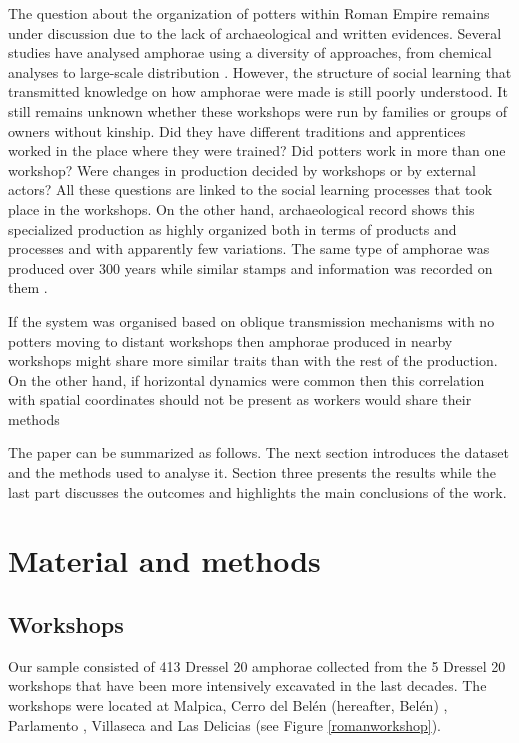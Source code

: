 \documentclass[review]{elsarticle}
\begin{document}
The question about the organization of potters within Roman Empire remains under discussion due to the lack of archaeological and written evidences. Several studies have analysed amphorae using a diversity of approaches, from chemical analyses to large-scale distribution \citep{isaksen_network_2006,brughmans_roman_2016,coto-sarmiento_maria_bayesian_????}. However, the structure of social learning that transmitted knowledge on how amphorae were made is still poorly understood. It still remains unknown whether these workshops were run by families or groups of owners without kinship. Did they have different traditions and apprentices worked in the place where they were trained? Did potters work in more than one workshop? Were changes in production decided by workshops or by external actors? All these questions are linked to the social learning processes that took place in the workshops. On the other hand, archaeological record shows this specialized production as highly organized both in terms of products and processes and with apparently few variations. The same type of amphorae was produced over 300 years while similar stamps and information was recorded on them \citep{remesal_anforas_2004}.

If the system was organised based on oblique transmission mechanisms with no potters moving to distant workshops then amphorae produced in nearby workshops might share more similar traits than with the rest of the production. On the other hand, if horizontal dynamics were common then this correlation with spatial coordinates should not be present as workers would share their methods

The paper can be summarized as follows. The next section introduces the dataset and the methods used to analyse it. Section three presents the results while the last part discusses the outcomes and highlights the main conclusions of the work. 

\section{Material and methods}

\subsection{Workshops}

Our sample consisted of 413 Dressel 20 amphorae collected from the 5 Dressel 20 workshops that have been more intensively excavated in the last decades. The workshops were located at Malpica, Cerro del Belén (hereafter, Belén) \citep{diaz_trujillo_excavacion_1992}, Parlamento \citep{garcia_vargas_anforas_2000}, Villaseca\citep{garcia_vargas_enrique_excavacion_????} and Las Delicias \citep{fernandez_excavacion_2001,_atelier_2014} (see Figure \ref{romanworkshop}).
\end{document}
